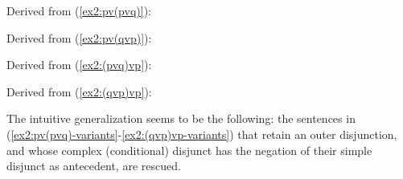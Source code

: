 \begin{exe}
	\ex Derived from (\ref{ex2:pv(pvq)}):
	\begin{xlist}
		\label{ex2:npt(pvq)}
		\label{ex2:pv(nptq)}
	\end{xlist}\label{ex2:pv(pvq)-variants}
	\ex Derived from (\ref{ex2:pv(qvp)}):
	\begin{xlist}
		\label{ex2:npt(qvp)}
		\label{ex2:pv(nqtp)}
	\end{xlist}\label{ex2:pv(qvp)-variants}
	\ex Derived from (\ref{ex2:(pvq)vp}):
	\begin{xlist}
		\label{ex2:n(pvq)tp}
		\label{ex2:(nptq)vp}
	\end{xlist}\label{ex2:(pvq)vp-variants}
	\ex Derived from (\ref{ex2:(qvp)vp}):
	\begin{xlist}
		\label{ex2:n(qvp)tp}
		\label{ex2:(nqtp)vp}
	\end{xlist}\label{ex2:(qvp)vp-variants}
\end{exe} 

The intuitive generalization seems to be the following: the sentences in (\ref{ex2:pv(pvq)-variants}-\ref{ex2:(qvp)vp-variants}) that retain an outer disjunction, and whose complex (conditional) disjunct has the negation of their simple disjunct as antecedent, are rescued.\\

